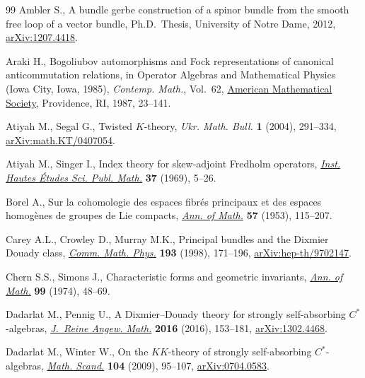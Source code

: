 \documentclass[11pt]{article}
\numberwithin{equation}{section}
\numberwithin{equation}{section}
\begin{document}
\begin{thebibliography}{99}
Ambler S., A bundle gerbe construction of a spinor bundle from the smooth free
 loop of a vector bundle, Ph.D.~Thesis, {U}niversity of {N}otre {D}ame, 2012,
 \href{https://arxiv.org/abs/1207.4418}{arXiv:1207.4418}.

Araki H., Bogoliubov automorphisms and {F}ock representations of canonical
 anticommutation relations, in Operator {A}lgebras and {M}athematical
 {P}hysics ({I}owa {C}ity, {I}owa, 1985), \textit{Contemp. Math.}, Vol.~62,
  \href{https://doi.org/10.1090/conm/062/878376}{American Mathematical Society}, Providence, RI, 1987, 23--141.

Atiyah M., Segal G., Twisted {$K$}-theory, \textit{Ukr. Math. Bull.} \textbf{1}
 (2004), 291--334, \href{https://arxiv.org/abs/math.KT/0407054}{arXiv:math.KT/0407054}.

Atiyah M., Singer I., Index theory for skew-adjoint {F}redholm operators,
  \href{https://doi.org/10.1007/BF02684885}{\textit{Inst. Hautes \'Etudes Sci. Publ. Math.}} \textbf{37} (1969), 5--26.

Borel A., Sur la cohomologie des espaces fibr\'es principaux et des espaces
 homog\`enes de groupes de {L}ie compacts, \href{https://doi.org/10.2307/1969728}{\textit{Ann. of Math.}} \textbf{57}
 (1953), 115--207.

Carey A.L., Crowley D., Murray M.K., Principal bundles and the {D}ixmier
 {D}ouady class, \href{https://doi.org/10.1007/s002200050323}{\textit{Comm. Math. Phys.}} \textbf{193} (1998), 171--196,
 \href{https://arxiv.org/abs/hep-th/9702147}{arXiv:hep-th/9702147}.

Chern S.S., Simons J., Characteristic forms and geometric invariants,
 \href{https://doi.org/10.2307/1971013}{\textit{Ann. of Math.}} \textbf{99} (1974), 48--69.

Dadarlat M., Pennig U., A {D}ixmier--{D}ouady theory for strongly
 self-absorbing {$C^*$}-algebras,  \href{https://doi.org/10.1515/crelle-2014-0044}{\textit{J.~Reine Angew. Math.}} \textbf{2016}
 (2016), 153--181, \href{https://arxiv.org/abs/1302.4468}{arXiv:1302.4468}.

Dadarlat M., Winter W., On the {$KK$}-theory of strongly self-absorbing
 {$C^*$}-algebras,  \href{https://doi.org/10.7146/math.scand.a-15086}{\textit{Math. Scand.}} \textbf{104} (2009), 95--107,
 \href{https://arxiv.org/abs/0704.0583}{arXiv:0704.0583}.


\end{thebibliography}
\end{document}
